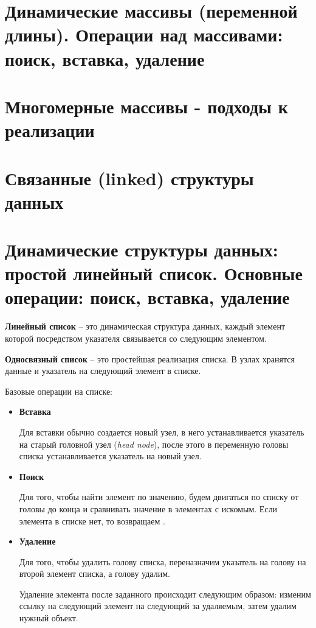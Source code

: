 \section{Динамические массивы (переменной длины). Операции над массивами: поиск, вставка, удаление}
\section{Многомерные массивы - подходы к реализации}
\section{Связанные (linked) структуры данных}
\section{Динамические структуры данных: простой линейный список. Основные операции: поиск, вставка, удаление}
\textbf{Линейный список} -- это динамическая структура данных, каждый элемент которой посредством указателя связывается со следующим элементом.

\textbf{Односвязный список} -- это простейшая реализация списка. В узлах хранятся данные и указатель на следующий элемент в списке.

Базовые операции на списке:
\begin{itemize}
    \item
          \textbf{Вставка}

          Для вставки обычно создается новый узел, в него устанавливается указатель на старый головной узел (\textit{head node}), после этого в переменную головы списка устанавливается указатель на новый узел.
    \item
          \textbf{Поиск}

          Для того, чтобы найти элемент по значению, будем двигаться по списку от головы до конца и сравнивать значение в элементах с искомым. Если элемента в списке нет, то возвращаем .
    \item
          \textbf{Удаление}

          Для того, чтобы удалить голову списка, переназначим указатель на голову на второй элемент списка, а голову удалим.

          Удаление элемента после заданного происходит следующим образом: изменим ссылку на следующий элемент на следующий за удаляемым, затем удалим нужный объект.
\end{itemize}

